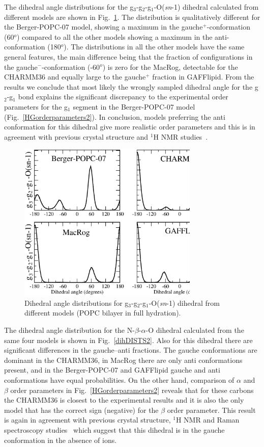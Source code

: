 \documentclass[pre,aps,floatfix,authordate1-4,twocolumn]{revtex4-1}
\begin{document}
The dihedral angle distributions for the  g$_3$-g$_2$-g$_1$-O(\textit{sn}-1) dihedral calculated from different models are
shown in Fig.~\ref{dihDISTS}. The distribution is qualitatively different for the Berger-POPC-07 model, showing a maximum in 
the gauche$^+$-conformation (60$^o$) compared to all the other models showing a maximum in the anti-conformation (180$^o$).
The distributions in all the other models have the same general features, the main difference being that the
fraction of configurations in the gauche$^-$-conformation (-60$^o$) is zero for the MacRog, detectable for the CHARMM36 and
equally large to the gauche$^+$ fraction in GAFFlipid. From the results we conclude that most likely the wrongly sampled
dihedral angle for the g$_2$-g$_1$ bond explains the significant discrepancy to the experimental order parameters
for the g$_1$ segment in the Berger-POPC-07 model (Fig.~\ref{HGorderparameters2}). 
In conclusion, models preferring the anti conformation for this dihedral give more realistic order parameters and
this is in agreement with previous crystal structure and $^1$H NMR studies~\cite{hauser80,hauser81,hauser81b,hauser88,pascher92,marsh06}.
\begin{figure}[]
  \centering
  \includegraphics[width=8.6cm]{g1-g2_Cdihs2.eps}
  \caption{\label{dihDISTS}
    Dihedral angle distributions for g$_3$-g$_2$-g$_1$-O(\textit{sn}-1) dihedral from different models (POPC bilayer in full hydration).
      } 
\end{figure}

The dihedral angle distribution for the  N-$\beta$-$\alpha$-O dihedral calculated from the same four models is 
shown in Fig.~\ref{dihDISTS2}. Also for this dihedral there are significant differences in the gauche--anti fractions.
The gauche conformations are dominant in the CHARMM36, in MacRog there are only anti conformations present,
and in the Berger-POPC-07 and GAFFlipid gauche and anti conformations have equal probabilities. 
On the other hand, comparison of $\alpha$ and $\beta$ order parameters in Fig.~\ref{HGorderparameters2}
reveals that for these carbons the CHARMM36 is closest to the experimental results and it is also the only model that has the correct
sign (negative) for the $\beta$ order parameter. This result is again in agreement with previous 
crystal structure, $^1$H NMR and Raman spectroscopy studies~\cite{hauser80,hauser81,hauser81b,akutsu81b} which suggest that
this dihedral is in the gauche conformation in the absence of ions.
\end{document}
